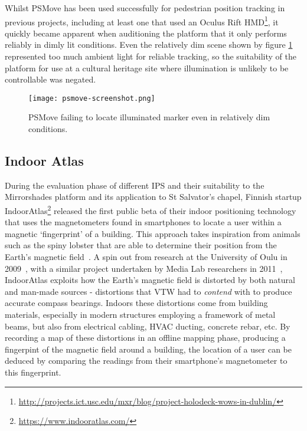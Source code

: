 Whilst PSMove has been used successfully for pedestrian position tracking in previous projects, including at least one that used an Oculus Rift HMD\footnote{\url{http://projects.ict.usc.edu/mxr/blog/project-holodeck-wows-in-dublin/}}, it quickly became apparent when auditioning the platform that it only performs reliably in dimly lit conditions. Even the relatively dim scene shown by figure \ref{psmove-screenshot.png} represented too much ambient light for reliable tracking, so the suitability of the platform for use at a cultural heritage site where illumination is unlikely to be controllable was negated.

\begin{figure}[h]
	\begin{center}
		\texttt{[image: psmove-screenshot.png]}
		\caption{PSMove failing to locate illuminated marker even in relatively dim conditions.}
		\label{psmove-screenshot.png}
	\end{center}
\end{figure}


\subsection{Indoor Atlas}

During the evaluation phase of different IPS and their suitability to the Mirrorshades platform and its application to St Salvator's chapel, Finnish startup IndoorAtlas\footnote{\url{https://www.indooratlas.com/}} released the first public beta of their indoor positioning technology that uses the magnetometers found in smartphones to locate a user within a magnetic `fingerprint' of a building. This approach takes inspiration from animals such as the spiny lobster that are able to determine their position from the Earth's magnetic field~\cite{Boles2003}. A spin out from research at the University of Oulu in 2009~\cite{Haverinen2009,Haverinen2009a}, with a similar project undertaken by Media Lab researchers in 2011~\cite{Chung2011}, IndoorAtlas exploits how the Earth's magnetic field is distorted by both natural and man-made sources - distortions that VTW had to \textit{contend} with to produce accurate compass bearings. Indoors these distortions come from building materials, especially in modern structures employing a framework of metal beams, but also from electrical cabling, HVAC ducting, concrete rebar, etc. By recording a map of these distortions in an offline mapping phase, producing a fingerpint of the magnetic field around a building, the location of a user can be deduced by comparing the readings from their smartphone's magnetometer to this fingerprint.

